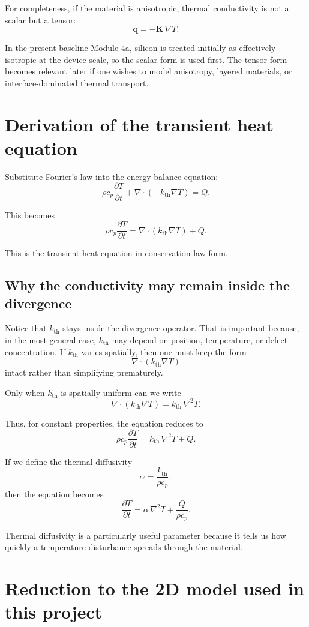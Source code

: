 \documentclass[11pt]{article}
\newcommand{\qvec}{\mathbf{q}}
\newcommand{\kth}{k_{\mathrm{th}}}
\begin{document}
For completeness, if the material is anisotropic, thermal conductivity is not a scalar but a tensor:
\[
\qvec = -\bm{K}\,\nabla T.
\]

In the present baseline Module 4a, silicon is treated initially as effectively isotropic at the device scale, so the scalar form is used first. The tensor form becomes relevant later if one wishes to model anisotropy, layered materials, or interface-dominated thermal transport.

\section{Derivation of the transient heat equation}

Substitute Fourier's law into the energy balance equation:
\[
\rho c_p \frac{\partial T}{\partial t} + \nabla \cdot (-\kth \nabla T) = Q.
\]

This becomes
\[
\rho c_p \frac{\partial T}{\partial t} = \nabla \cdot (\kth \nabla T) + Q.
\]

This is the transient heat equation in conservation-law form.

\subsection{Why the conductivity may remain inside the divergence}

Notice that $\kth$ stays inside the divergence operator. That is important because, in the most general case, $\kth$ may depend on position, temperature, or defect concentration. If $\kth$ varies spatially, then one must keep the form
\[
\nabla \cdot (\kth \nabla T)
\]
intact rather than simplifying prematurely.

Only when $\kth$ is spatially uniform can we write
\[
\nabla \cdot (\kth \nabla T) = \kth \, \nabla^2 T.
\]

Thus, for constant properties, the equation reduces to
\[
\rho c_p \frac{\partial T}{\partial t} = \kth \, \nabla^2 T + Q.
\]

If we define the thermal diffusivity
\[
\alpha = \frac{\kth}{\rho c_p},
\]
then the equation becomes
\[
\frac{\partial T}{\partial t} = \alpha \, \nabla^2 T + \frac{Q}{\rho c_p}.
\]

Thermal diffusivity is a particularly useful parameter because it tells us how quickly a temperature disturbance spreads through the material.

\section{Reduction to the 2D model used in this project}
\end{document}
